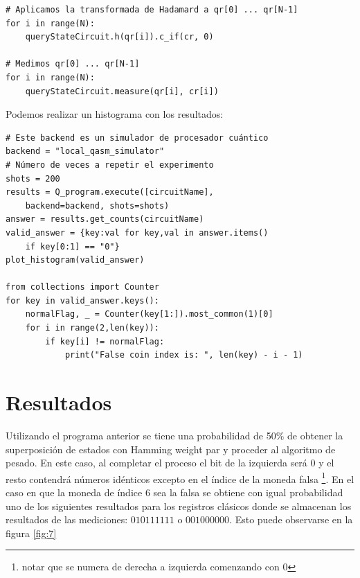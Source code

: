 \documentclass{article}
\begin{document}
\begin{verbatim}
# Aplicamos la transformada de Hadamard a qr[0] ... qr[N-1]
for i in range(N):
    queryStateCircuit.h(qr[i]).c_if(cr, 0)

# Medimos qr[0] ... qr[N-1]
for i in range(N):
    queryStateCircuit.measure(qr[i], cr[i])
\end{verbatim}


Podemos realizar un histograma con los resultados:

\begin{verbatim}
# Este backend es un simulador de procesador cuántico
backend = "local_qasm_simulator"
# Número de veces a repetir el experimento
shots = 200 
results = Q_program.execute([circuitName], 
    backend=backend, shots=shots)
answer = results.get_counts(circuitName)
valid_answer = {key:val for key,val in answer.items() 
    if key[0:1] == "0"}
plot_histogram(valid_answer)

from collections import Counter
for key in valid_answer.keys():
    normalFlag, _ = Counter(key[1:]).most_common(1)[0] 
    for i in range(2,len(key)):
        if key[i] != normalFlag:
            print("False coin index is: ", len(key) - i - 1)
\end{verbatim}
\section*{Resultados}

Utilizando el programa anterior se tiene una probabilidad de 50\% de obtener la superposición de estados con Hamming weight par y proceder al algoritmo de pesado. En este caso, al completar el proceso el bit de la izquierda será 0 y el resto contendrá números idénticos excepto en el índice de la moneda falsa \footnote{notar que se numera de derecha a izquierda comenzando con 0}. En el caso en que la moneda de índice 6 sea la falsa se obtiene con igual probabilidad uno de los siguientes resultados para los registros clásicos donde se almacenan los resultados de las mediciones: $010111111$ o $001000000$. Esto puede observarse en la figura \ref{fig:7}
\end{document}
